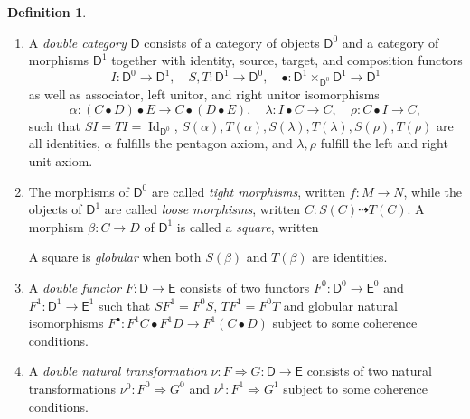 \documentclass[11pt]{report}
\theoremstyle{definition}
\newtheorem{definition}[theorem]{Definition}
\theoremstyle{remark}
\theoremstyle{remark}
\begin{document}
\begin{definition}
\begin{enumerate}[label=(\roman*)]
\item A \emph{double category} $\mathsf{D}$ consists of a category of objects $\mathsf{D}^0$ and a category of morphisms $\mathsf{D}^1$ together with identity, source, target, and composition functors
\begin{equation*}
I: \mathsf{D}^0 \to \mathsf{D}^1, \quad S,T: \mathsf{D}^1 \to \mathsf{D}^0, \quad \bullet: \mathsf{D}^1 \times_{\mathsf{D}^0} \mathsf{D}^1 \to \mathsf{D}^1
\end{equation*}
as well as associator, left unitor, and right unitor isomorphisms
\begin{equation*}
\alpha: (C \bullet D) \bullet E \to C \bullet (D \bullet E), \quad \lambda: I \bullet C \to C, \quad \rho: C \bullet I \to C,
\end{equation*}
such that $SI = TI = \operatorname{Id}_{\mathsf{D}^0}$, $S(\alpha), T(\alpha), S(\lambda), T(\lambda), S(\rho), T(\rho)$ are all identities, $\alpha$ fulfills the pentagon axiom, and $\lambda, \rho$ fulfill the left and right unit axiom.
\item The morphisms of $\mathsf{D}^0$ are called \emph{tight morphisms}, written $f: M \to N$, while the objects of $\mathsf{D}^1$ are called \emph{loose morphisms}, written $C: S(C) \dashrightarrow T(C)$. A morphism $\beta: C \to D$ of $\mathsf{D}^1$ is called a \emph{square}, written
\begin{center}
\end{center}
A square is \emph{globular} when both $S(\beta)$ and $T(\beta)$ are identities.
\item A \emph{double functor} $F: \mathsf{D} \to \mathsf{E}$ consists of two functors $F^0: \mathsf{D}^0 \to \mathsf{E}^0$ and $F^1: \mathsf{D}^1 \to \mathsf{E}^1$ such that $SF^1 = F^0S$, $TF^1 = F^0T$ and globular natural isomorphisms $F^\bullet: F^1 C \bullet F^1 D \to F^1(C \bullet D)$ subject to some coherence conditions.
\item A \emph{double natural transformation} $\nu: F \Rightarrow G: \mathsf{D} \to \mathsf{E}$ consists of two natural transformations $\nu^0: F^0 \Rightarrow G^0$ and $\nu^1: F^1 \Rightarrow G^1$ subject to some coherence conditions.

\end{enumerate}
\end{definition}
\end{document}
